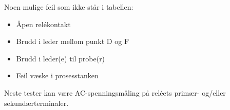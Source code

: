 Noen mulige feil som ikke står i tabellen:

\begin{itemize}
\item{} Åpen relékontakt
\item{} Brudd i leder mellom punkt D og F
\item{} Brudd i leder(e) til probe(r)
\item{} Feil væske i prosesstanken
\end{itemize}

Neste tester kan være AC-spenningsmåling på reléets primær- og/eller sekundærterminaler.


